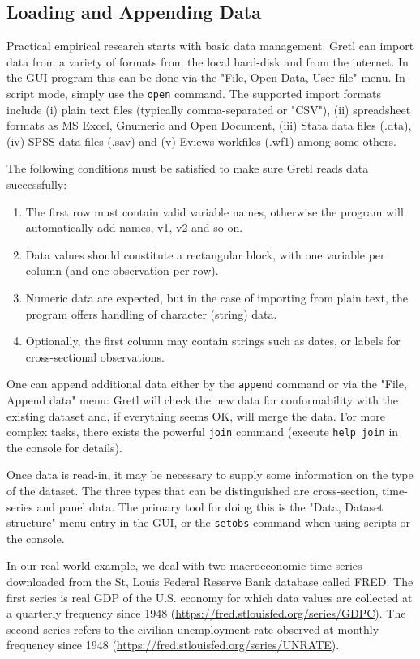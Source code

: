 \documentclass[11pt]{article}
\begin{document}
\subsection{Loading and Appending Data}
\label{sec:dataloadappend}
Practical empirical research starts with basic data management. Gretl can import data from a variety of formats from the local hard-disk and from the internet. In the GUI program this can be done via the "File, Open Data, User file" menu. In script mode, simply use the \texttt{open} command. The supported import formats include (i) plain text files (typically comma-separated or "CSV"), (ii) spreadsheet formats as MS Excel, Gnumeric and Open Document, (iii) Stata data files (.dta), (iv) SPSS data files (.sav) and (v) Eviews workfiles (.wf1) among some others.

The following conditions must be satisfied to make sure Gretl reads data successfully:
\begin{enumerate}
	\item The first row must contain valid variable names, otherwise the program will automatically add names, v1, v2 and so on.
	\item Data values should constitute a rectangular block, with one variable per column (and one observation per row).
	\item Numeric data are expected, but in	the case of importing from plain text, the program offers handling of character (string) data.
	\item Optionally, the first column may contain strings such as	dates, or labels for cross-sectional observations.
\end{enumerate}

One can append additional data either by the \texttt{append} command or via the "File, Append data" menu: Gretl will check the
new data for conformability with the existing dataset and, if everything seems OK, will merge the data. For more complex tasks, there exists the powerful \texttt{join} command (execute \texttt{help join} in the console for details).

Once data is read-in, it may be necessary to supply some information on the type of the dataset. The three types that can be distinguished are cross-section, time-series and panel data. The primary tool for doing this is the "Data, Dataset structure" menu entry in the GUI, or the \texttt{setobs} command when using scripts or the console.

In our real-world example, we deal with two macroeconomic time-series downloaded from the St, Louis Federal Reserve Bank database called FRED. %
The first series is real GDP of the U.S. economy for which data values are collected at a quarterly frequency since 1948 (\url{https://fred.stlouisfed.org/series/GDPC}). The second series refers to the civilian unemployment rate observed at monthly frequency since 1948 (\url{https://fred.stlouisfed.org/series/UNRATE}).
\end{document}
